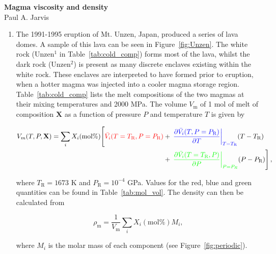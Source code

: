 \documentclass[]{book}
\theoremstyle{definition}
\begin{document}
\begin{center}
{\textbf{Magma viscosity and density}}\\
Paul A. Jarvis\\ %
\end{center}

\vspace{0.2 cm}


\begin{enumerate}
\item The 1991-1995 eruption of Mt. Unzen, Japan, produced a series of lava domes. A sample of this lava can be seen in Figure~\ref{fig:Unzen}. The white rock (Unzen$^{1}$ in Table~\ref{tab:cold_comp}) forms most of the lava, whilst the dark rock (Unzen$^{2}$) is present as many discrete enclaves existing within the white rock. These enclaves are interpreted to have formed prior to eruption, when a hotter magma was injected into a cooler magma storage region. Table~\ref{tab:cold_comp} lists the melt compositions of the two magmas at their mixing temperatures and 2000 MPa. The volume $V_{\text{m}}$ of 1 mol of melt of composition $\mathbf{X}$ as a function of pressure $P$ and temperature $T$ is given by

  \begin{align}
    \label{equ:mol_vol}
    V_{m}(T, P, \mathbf{X}) = \sum_{i} X_{i}(\text{mol\%}) \Bigg[ \textcolor{red}{\bar{V_{i}}(T = T_{\text{R}}, P = P_{\text{R}})} & + \left. \textcolor{blue}{\left. \frac{\partial \bar{V_{i}}(T, P = P_{\text{R}})}{\partial T}\right|_{T = T_{\text{R}}}} (T - T_{\text{R}}) \right. \nonumber \\
      & + \left. \textcolor{green}{\left.\frac{\partial \bar{V_{i}}(T = T_{\text{R}}, P)}{\partial P}\right|_{P = P_{R}}} (P - P_{\text{R}})\right], 
  \end{align}

  where $T_{\text{R}} = 1673$ K and $P_{\text{R}} = 10^{-4}$ GPa. Values for the red, blue and green quantities can be found in Table~\ref{tab:mol_vol}. The density can then be calculated from

  \begin{equation}
    \label{equ:dens}
    \rho_{\text{m}} = \frac{1}{V_{\text{m}}} \sum_{i} X_{i}(\text{mol\%}) M_{i},
  \end{equation}

  where $M_{i}$ is the molar mass of each component (see Figure~\ref{fig:periodic}).
  

\end{enumerate}
\end{document}
